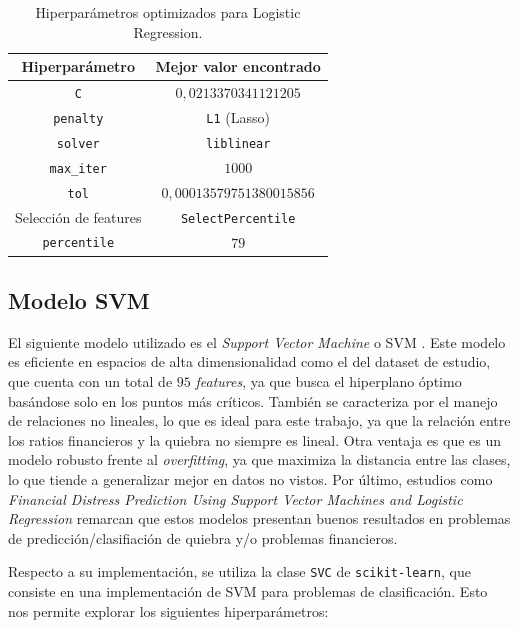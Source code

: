 \begin{table}[h]
	\centering
	\caption[Hiperparámetros - LR]{Hiperparámetros optimizados para Logistic Regression.}
	\begin{tabular}{c c}
		\toprule
		\textbf{Hiperparámetro} 	 & \textbf{Mejor valor encontrado} \\
		\midrule
        \texttt{C} & $0,0213370341121205$\\
        \texttt{penalty} & \texttt{L1} (Lasso) \\
        \texttt{solver} & \texttt{liblinear} \\
        \texttt{max\_iter} & $1000$ \\
        \texttt{tol} & $0,00013579751380015856$ \\
        Selección de features & \texttt{SelectPercentile} \\
        \texttt{percentile} &  $79$ \\
		\bottomrule
		\hline
	\end{tabular}
	\label{tab:log-reg-hip}
\end{table}

\subsection{Modelo SVM}

El siguiente modelo utilizado es el \textit{Support Vector Machine} o SVM \citep{model:svm}. Este modelo es eficiente en espacios de alta dimensionalidad como el del dataset de estudio, que cuenta con un total de $95$ \textit{features}, ya que busca el hiperplano óptimo basándose solo en los puntos más críticos. También se caracteriza por el manejo de relaciones no lineales, lo que es ideal para este trabajo, ya que la relación entre los ratios financieros y la quiebra no siempre es lineal. Otra ventaja es que es un modelo robusto frente al \textit{overfitting}, ya que maximiza la distancia entre las clases, lo que tiende a generalizar mejor en datos no vistos. Por último, estudios como \textit{Financial Distress Prediction Using Support Vector Machines and Logistic Regression} \citep{article:financial_distress_svm} remarcan que estos modelos presentan buenos resultados en problemas de predicción/clasifiación de quiebra y/o problemas financieros.

Respecto a su implementación, se utiliza la clase \texttt{SVC} \citep{WEBSITE:sklearn_SVC} de \texttt{scikit-learn}, que consiste en una implementación de SVM para problemas de clasificación. Esto nos permite explorar los siguientes hiperparámetros:

